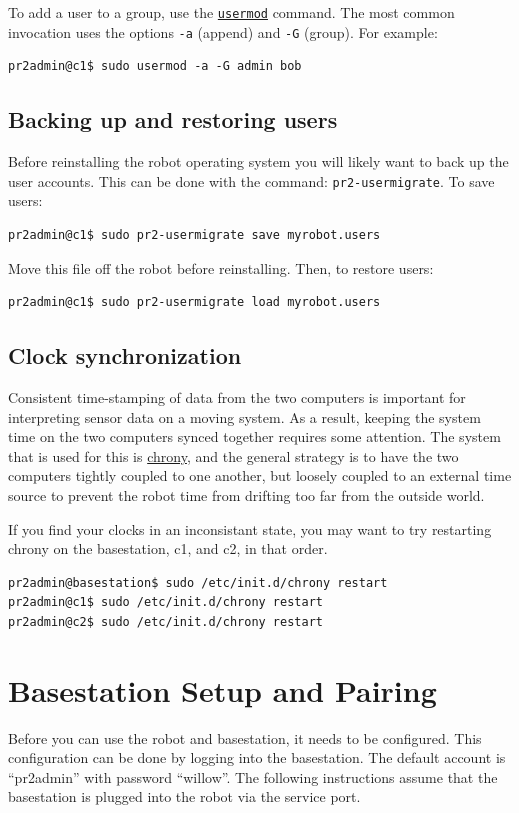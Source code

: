 To add a user to a group, use the
\texttt{\href{http://unixhelp.ed.ac.uk/CGI/man-cgi?usermod}{usermod}}
command.  The most common invocation uses the options \texttt{-a}
(append) and \texttt{-G} (group).  For example:

\begin{verbatim}
pr2admin@c1$ sudo usermod -a -G admin bob
\end{verbatim}

\subsection{Backing up and restoring users}
Before reinstalling the robot operating system you will likely want to
back up the user accounts. This can be done with the command:
\texttt{pr2-usermigrate}. To save users:
\begin{verbatim}
pr2admin@c1$ sudo pr2-usermigrate save myrobot.users
\end{verbatim}

Move this file off the robot before reinstalling.  Then, to restore users:
\begin{verbatim}
pr2admin@c1$ sudo pr2-usermigrate load myrobot.users
\end{verbatim}

\subsection{Clock synchronization}
Consistent time-stamping of data from the two computers is important
for interpreting sensor data on a moving system.  As a result, keeping
the system time on the two computers synced together requires some
attention.  The system that is used for this is
\href{http://chrony.tuxfamily.org/}{chrony}, and the general strategy
is to have the two computers tightly coupled to one another, but
loosely coupled to an external time source to prevent the robot time
from drifting too far from the outside world.

If you find your clocks in an inconsistant state, you may want to try
restarting chrony on the basestation, c1, and c2, in that order.
\begin{verbatim}
pr2admin@basestation$ sudo /etc/init.d/chrony restart
pr2admin@c1$ sudo /etc/init.d/chrony restart
pr2admin@c2$ sudo /etc/init.d/chrony restart
\end{verbatim}

\section{Basestation Setup and Pairing}
Before you can use the robot and basestation, it needs to be
configured.  This configuration can be done by logging into the
basestation.  The default account is ``pr2admin'' with password
``willow''.  The following instructions assume that the basestation is
plugged into the robot via the service port.

